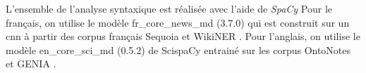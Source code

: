 L'ensemble de l'analyse syntaxique est réalisée avec l'aide de \emph{SpaCy} \cite{SpaCy101Everything,honnibalSpaCyIndustrialstrengthNatural2020,patelAppliedNaturalLanguage2021}
Pour le français, on utilise le modèle \textsf{fr\_core\_news\_md} (3.7.0) qui est construit sur un \gls{cnn} \cite{honnibalSpacyNaturalLanguage2017} à partir des corpus français Sequoia \cite{canditoCorpusSequoiaAnnotation2012,barqueDeepSequoiaCorpus2020} et WikiNER \cite{nothmanLearningMultilingualNamed2013,LearningMultilingualNamed2017}.
Pour l'anglais, on utilise le modèle \textsf{en\_core\_sci\_md} (0.5.2) de ScispaCy \cite{neumannScispaCyFastRobust2019,AllenaiScispacy2020} entrainé sur les corpus OntoNotes \cite{weischedelOntoNotesLargeTraining2011,weischedelralphOntoNotesRelease2013} et GENIA \cite{kimGENIACorpusSemantically2003,mccloskySelfTrainingBiomedicalParsing2008}.
